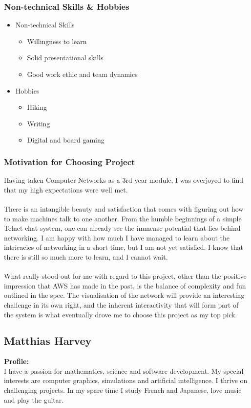\documentclass{article}
\begin{document}
	\subsubsection{Non-technical Skills \& Hobbies}
		\begin{itemize}
			\item Non-technical Skills
			\begin{itemize}
				\item Willingness to learn
				\item Solid presentational skills
				\item Good work ethic and team dynamics
			\end{itemize}
			\item Hobbies
			\begin{itemize}
				\item Hiking
				\item Writing
				\item Digital and board gaming
			\end{itemize}
		\end{itemize}
	\subsubsection{Motivation for Choosing Project}
	Having taken Computer Networks as a 3rd year module, I was overjoyed to find that my high 	expectations were well met. 
\\\\
There is an intangible beauty and satisfaction that comes with figuring out how to make machines talk to one another. From the humble beginnings of a simple Telnet chat system, one can already see the immense potential that lies behind networking. I am happy with how much I have managed to learn about the intricacies of networking in a short time, but I am not yet satisfied. I know that there is still so much more to learn, and I cannot wait.
\\\\
	What really stood out for me with regard to this project, other than the positive impression that AWS has made in the past, is the balance of complexity and fun outlined in the spec. The visualisation of the network will provide an interesting challenge in its own right, and the inherent interactivity that will form part of the system is what eventually drove me to choose this project as my top pick.  

	\cleardoublepage

	\subsection{Matthias Harvey}
	\textbf{Profile:}\\
	I have a passion for mathematics, science and software development. My special interests are computer graphics, simulations and artificial intelligence. I thrive on challenging projects. In my spare time I study French and Japanese, love music and play the guitar.
\end{document}
